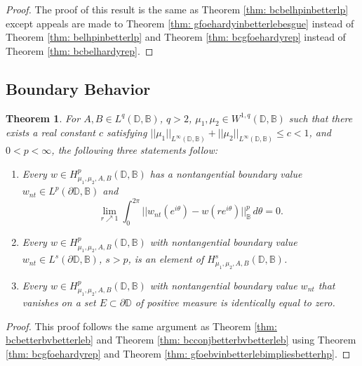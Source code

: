 \documentclass[12pt,reqno]{amsart}
\newtheorem{theorem}{Theorem}[section]
\theoremstyle{definition}
\theoremstyle{remark}
\newcommand{\p}{\partial}
\newcommand{\bc}{\mathbb{B}}
\newcommand{\disk}{\mathbb{D}}
\begin{document}
\begin{proof}
The proof of this result is the same as Theorem \ref{thm: bcbelhpinbetterlp} except appeals are made to Theorem \ref{thm: gfoehardyinbetterlebesgue} instead of Theorem \ref{thm: belhpinbetterlp} and Theorem \ref{thm: bcgfoehardyrep} instead of Theorem \ref{thm: bcbelhardyrep}.

\end{proof}





    \subsection{Boundary Behavior}
    
      \begin{theorem}
       For $A, B \in L^q(\disk,\bc)$, $q>2$, $\mu_1,\mu_2 \in W^{1,q}(\disk,\bc)$ such that there exists a real constant $c$ satisfying $||\mu_1||_{L^\infty(\disk,\bc)}+||\mu_2||_{L^\infty(\disk,\bc)} \leq c < 1$, and $0 < p < \infty$, the following three statements follow:
	\begin{enumerate}
	\item Every $w \in H^p_{\mu_1,\mu_2,A,B}(\disk,\bc)$ has a nontangential boundary value $w_{nt} \in L^p(\p \disk, \bc)$ and
        \[
        \lim_{r \nearrow 1} \int_0^{2\pi} ||w_{nt}(e^{i\theta}) - w(re^{i\theta}) ||^p_{\bc} \, d\theta  = 0. 
        \]
	\item Every $w \in H^p_{\mu_1,\mu_2,A,B}(\disk,\bc)$ with nontangential boundary value $w_{nt} \in L^s(\p\disk, \bc)$, $s>p$, is an element of $H^s_{\mu_1,\mu_2,A,B}(\disk,\bc)$. 
	\item Every $w \in H^p_{\mu_1,\mu_2,A,B}(\disk,\bc)$ with nontangential boundary value $w_{nt}$ that vanishes on a set $E \subset \p \disk$ of positive measure is identically equal to zero. 
	\end{enumerate}
    \end{theorem}
    
        \begin{proof}
    This proof follows the same argument as Theorem \ref{thm: bcbetterbvbetterleb} and Theorem \ref{thm: bcconjbetterbvbetterleb} using Theorem \ref{thm: bcgfoehardyrep} and Theorem \ref{thm: gfoebvinbetterlebimpliesbetterhp}.
    \end{proof}
    
    
\end{document}
